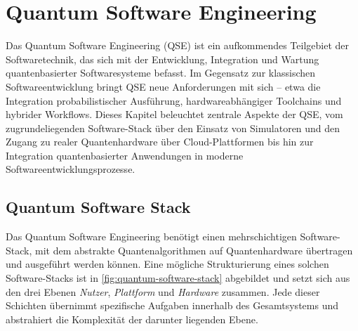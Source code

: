\section{Quantum Software Engineering}

Das Quantum Software Engineering (QSE) ist ein aufkommendes Teilgebiet der Softwaretechnik, das sich mit der Entwicklung, Integration und Wartung quantenbasierter Softwaresysteme befasst. Im Gegensatz zur klassischen Softwareentwicklung bringt QSE neue Anforderungen mit sich – etwa die Integration probabilistischer Ausführung, hardwareabhängiger Toolchains und hybrider Workflows. \autocite{zhao_quantum-based_2025} Dieses Kapitel beleuchtet zentrale Aspekte der QSE, vom zugrundeliegenden Software-Stack über den Einsatz von Simulatoren und den Zugang zu realer Quantenhardware über Cloud-Plattformen bis hin zur Integration quantenbasierter Anwendungen in moderne Softwareentwicklungsprozesse.

\subsection{Quantum Software Stack}
\label{sec:quantum-software-stack}

Das Quantum Software Engineering benötigt einen mehrschichtigen Software-Stack, mit dem abstrakte Quantenalgorithmen auf Quantenhardware übertragen und ausgeführt werden können. Eine mögliche Strukturierung eines solchen Software-Stacks ist in \autoref{fig:quantum-software-stack} abgebildet und setzt sich aus den drei Ebenen \textit{Nutzer}, \textit{Plattform} und \textit{Hardware} zusammen. Jede dieser Schichten übernimmt spezifische Aufgaben innerhalb des Gesamtsystems und abstrahiert die Komplexität der darunter liegenden Ebene.
\\

